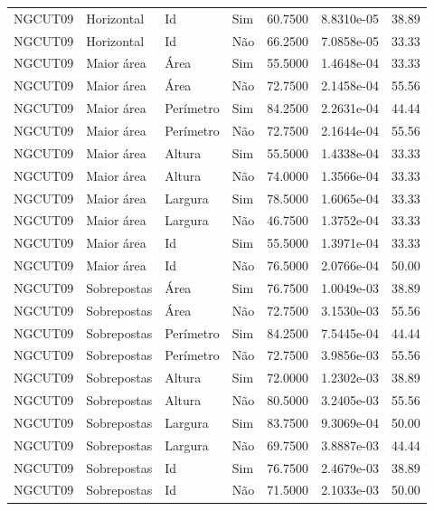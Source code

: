 \begin{tabular}{llllrrr}
    NGCUT09   & Horizontal  & Id        & Sim         & 60.7500      & 8.8310e-05 & 38.89    \\
    NGCUT09   & Horizontal  & Id        & Não         & 66.2500      & 7.0858e-05 & 33.33    \\
    NGCUT09   & Maior área  & Área      & Sim         & 55.5000      & 1.4648e-04 & 33.33    \\
    NGCUT09   & Maior área  & Área      & Não         & 72.7500      & 2.1458e-04 & 55.56    \\
    NGCUT09   & Maior área  & Perímetro & Sim         & 84.2500      & 2.2631e-04 & 44.44    \\
    NGCUT09   & Maior área  & Perímetro & Não         & 72.7500      & 2.1644e-04 & 55.56    \\
    NGCUT09   & Maior área  & Altura    & Sim         & 55.5000      & 1.4338e-04 & 33.33    \\
    NGCUT09   & Maior área  & Altura    & Não         & 74.0000      & 1.3566e-04 & 33.33    \\
    NGCUT09   & Maior área  & Largura   & Sim         & 78.5000      & 1.6065e-04 & 33.33    \\
    NGCUT09   & Maior área  & Largura   & Não         & 46.7500      & 1.3752e-04 & 33.33    \\
    NGCUT09   & Maior área  & Id        & Sim         & 55.5000      & 1.3971e-04 & 33.33    \\
    NGCUT09   & Maior área  & Id        & Não         & 76.5000      & 2.0766e-04 & 50.00    \\
    NGCUT09   & Sobrepostas & Área      & Sim         & 76.7500      & 1.0049e-03 & 38.89    \\
    NGCUT09   & Sobrepostas & Área      & Não         & 72.7500      & 3.1530e-03 & 55.56    \\
    NGCUT09   & Sobrepostas & Perímetro & Sim         & 84.2500      & 7.5445e-04 & 44.44    \\
    NGCUT09   & Sobrepostas & Perímetro & Não         & 72.7500      & 3.9856e-03 & 55.56    \\
    NGCUT09   & Sobrepostas & Altura    & Sim         & 72.0000      & 1.2302e-03 & 38.89    \\
    NGCUT09   & Sobrepostas & Altura    & Não         & 80.5000      & 3.2405e-03 & 55.56    \\
    NGCUT09   & Sobrepostas & Largura   & Sim         & 83.7500      & 9.3069e-04 & 50.00    \\
    NGCUT09   & Sobrepostas & Largura   & Não         & 69.7500      & 3.8887e-03 & 44.44    \\
    NGCUT09   & Sobrepostas & Id        & Sim         & 76.7500      & 2.4679e-03 & 38.89    \\
    NGCUT09   & Sobrepostas & Id        & Não         & 71.5000      & 2.1033e-03 & 50.00    \\
    \hline
\end{tabular}